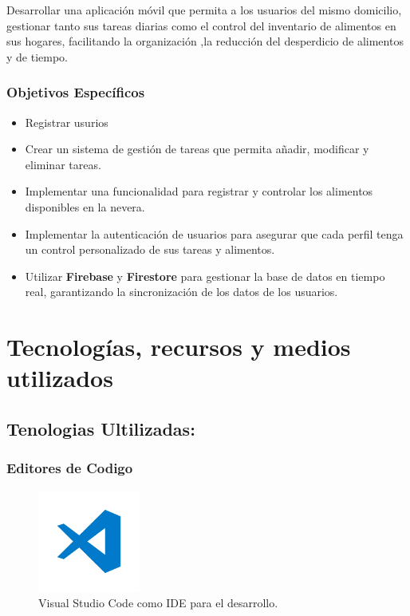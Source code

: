 \documentclass{article}
\begin{document}
\begin{flushleft}
Desarrollar una aplicación móvil que permita a los usuarios del mismo domicilio, gestionar tanto sus tareas diarias como el control del inventario de alimentos en sus hogares, facilitando la organización ,la reducción del desperdicio de alimentos y de tiempo.


\subsubsection{Objetivos Específicos}

\begin{itemize}

    \item Registrar usurios 
    \item Crear un sistema de gestión de tareas que permita añadir, modificar y eliminar tareas.
    \item Implementar una funcionalidad para registrar y controlar los alimentos disponibles en la nevera.
    \item Implementar la autenticación de usuarios para asegurar que cada perfil tenga un control personalizado de sus tareas y alimentos.
    \item Utilizar \textbf{Firebase} y \textbf{Firestore} para gestionar la base de datos en tiempo real, garantizando la sincronización de los datos de los usuarios.
\end{itemize}
        
\section{Tecnologías, recursos y medios utilizados}

\subsection{Tenologias Ultilizadas:}



\subsubsection{Editores de Codigo}

     
\begin{figure}[H]
    \centering
    \includegraphics[width=0.3\textwidth]{TFG/img/vs.png}
    \caption{Visual Studio Code como IDE para el desarrollo.}
    \label{fig:vs_code}
\end{figure}


\end{flushleft}
\end{document}
